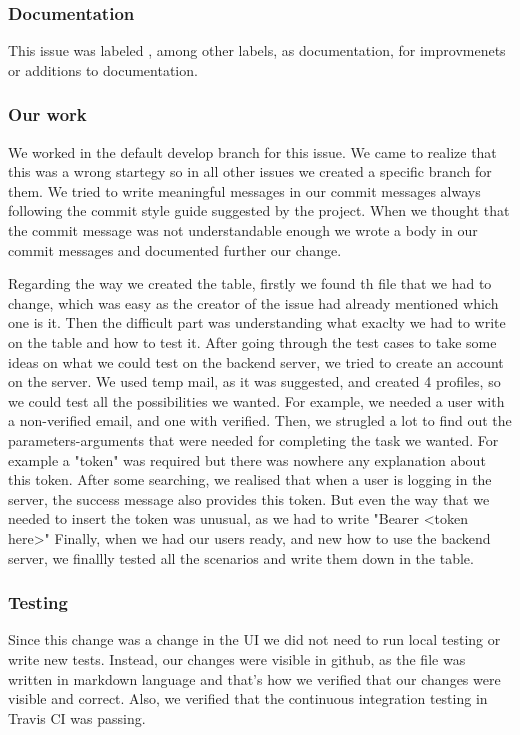 \documentclass{article}
\begin{document}
\subsubsection{Documentation}
This issue was labeled , among other labels, as documentation, for improvmenets or additions to documentation.
\subsubsection{Our work}
\hspace{0.5cm}We worked in the default develop branch for this issue. We came to realize that this was a wrong startegy so in all other issues we created a specific branch for them. We tried to write meaningful messages in our commit messages always following the commit style guide suggested by the project. When we thought that the commit message was not understandable enough we wrote a body in our commit messages and documented further our change.

Regarding the way we created the table, firstly we found th file that we had to change, which was easy as the creator of the issue had already mentioned which one is it. Then the difficult part was understanding what exaclty we had to write on the table and how to test it. After going through the test cases to take some ideas on what we could test on the backend server, we tried to create an account on the server. We used temp mail, as it was suggested, and created 4 profiles, so we could test all the possibilities we wanted. For example, we needed a user with a non-verified email, and one with verified. 
Then, we strugled a lot to find out the parameters-arguments that were needed for completing the task we wanted. For example a "token" was required but there was nowhere any explanation about this token. After some searching, we realised that when a user is logging in the server, the success message also provides this token. But even the way that we needed to insert the token was unusual, as we had to write "Bearer <token here>"
Finally, when we had our users ready, and new how to use the backend server, we finallly tested all the scenarios and write them down in the table.

\subsubsection{Testing}
\hspace{0.5cm}Since this change was a change in the UI we did not need to run local testing or write new tests. Instead, our changes were visible in github, as the file was written in markdown language and that's how we verified that our changes were visible and correct. Also, we verified that the continuous integration testing in Travis CI was passing. 
\end{document}
